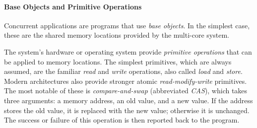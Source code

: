 \paragraph{Base Objects and Primitive Operations}
Concurrent applications are programs that use \emph{base objects}.
In the simplest case, these are the shared memory locations provided by the multi-core system.

The system's hardware or operating system provide \emph{primitive operations} that can be applied to memory locations. The simplest primitives, which are always assumed,
are the familiar \emph{read} and \emph{write} operations,
also called \emph{load} and \emph{store}.
Modern architectures also provide stronger atomic \emph{read-modify-write} primitives. The most notable of these is \emph{compare-and-swap} (abbreviated \textit{CAS}), which takes three arguments: a memory address, an old value, and a new value. If the address stores the old value, it is replaced with the new value; otherwise it is unchanged. The success or failure of this operation is then reported back to the program.
%
%


